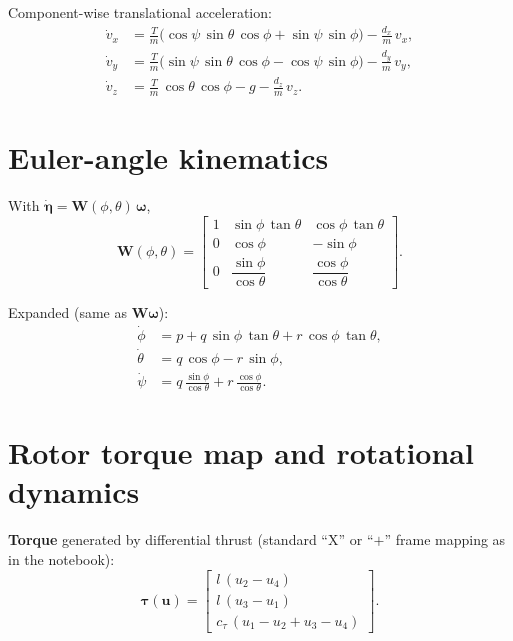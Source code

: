 \documentclass[11pt]{article}
\begin{document}
Component-wise translational acceleration:
\begin{align}
  \dot{v}_x &= \frac{T}{m}\bigl(\cos\psi\,\sin\theta\,\cos\phi + \sin\psi\,\sin\phi\bigr)
             - \frac{d_x}{m}\,v_x, \\
  \dot{v}_y &= \frac{T}{m}\bigl(\sin\psi\,\sin\theta\,\cos\phi - \cos\psi\,\sin\phi\bigr)
             - \frac{d_y}{m}\,v_y, \\
  \dot{v}_z &= \frac{T}{m}\,\cos\theta\,\cos\phi - g - \frac{d_z}{m}\,v_z.
\end{align}

\section*{Euler-angle kinematics}

With $\dot{\bm{\eta}} = \bm{W}(\phi,\theta)\,\bm{\omega}$,
\begin{equation}
  \bm{W}(\phi,\theta)
  =
  \begin{bmatrix}
    1 & \sin\phi\,\tan\theta & \cos\phi\,\tan\theta \\
    0 & \cos\phi & -\sin\phi \\
    0 & \dfrac{\sin\phi}{\cos\theta} & \dfrac{\cos\phi}{\cos\theta}
  \end{bmatrix}.
\end{equation}

Expanded (same as $\bm{W}\bm{\omega}$):
\begin{align}
  \dot{\phi}   &= p + q\,\sin\phi\,\tan\theta + r\,\cos\phi\,\tan\theta, \\
  \dot{\theta} &= q\,\cos\phi - r\,\sin\phi, \\
  \dot{\psi}   &= q\,\frac{\sin\phi}{\cos\theta} + r\,\frac{\cos\phi}{\cos\theta}.
\end{align}

\section*{Rotor torque map and rotational dynamics}

\textbf{Torque} generated by differential thrust (standard ``X'' or ``$+$'' frame mapping as in the notebook):
\begin{equation}
  \bm{\tau}(\bm{u})
  =
  \begin{bmatrix}
    l\,(u_2 - u_4) \\
    l\,(u_3 - u_1) \\
    c_\tau\,(u_1 - u_2 + u_3 - u_4)
  \end{bmatrix}.
\end{equation}
\end{document}

